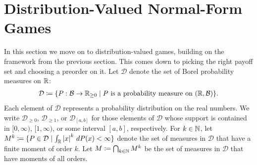 \documentclass[a4paper]{scrreprt}
\newcommand{\Rp}{\mathbb{R}_{\geq 0}}
\newcommand{\B}{\mathcal{B}}
\newcommand{\M}{M}
\theoremstyle{definition}
\begin{document}
    \section{Distribution-Valued Normal-Form Games}
    \label{sec:distributionValuedNormalFormGames}
    \newcommand{\DP}{\mathcal{D}} %
    \newcommand{\Dgeqzero}{\DP_{\geq0}}
    \newcommand{\Dgeqone}{\DP_{\geq1}}
    \newcommand{\Dab}{\DP_{[a, b]}}
    
    In this section we move on to distribution-valued games, building on the framework from the previous section.
    This comes down to picking the right payoff set and choosing a preorder on it.
    Let $\DP$ denote the set of Borel probability measures on $\mathbb{R}$:
    \begin{gather*}
        \DP \coloneqq \set{P: \B \to \Rp \mid P \text{ is a probability measure on } (\R, \B)}.
    \end{gather*}
    Each element of $\DP$ represents a probability distribution on the real numbers.
    We write $\Dgeqzero$, $\Dgeqone$, or $\Dab$ for those elements of $\DP$ whose support is contained in $[0, \infty)$, $[1, \infty)$, or some interval $[a, b]$, respectively.
    For $k \in \mathbb{N}$, let $\M^k \coloneqq \set{P \in \DP \mid \lintegral{\R}{\abs{x}^k}{P(x)} < \infty}$ denote the set of measures in $\DP$ that have a finite moment of order $k$. Let $\M \coloneqq \bigcap_{k \in \N} \M^k$ be the set of measures in $\DP$ that have moments of all orders.
    
    \let\dleq\preccurlyeq
    \let\dgeq\succcurlyeq
    \let\dless\prec
    \let\dgreater\succ
    
\end{document}
